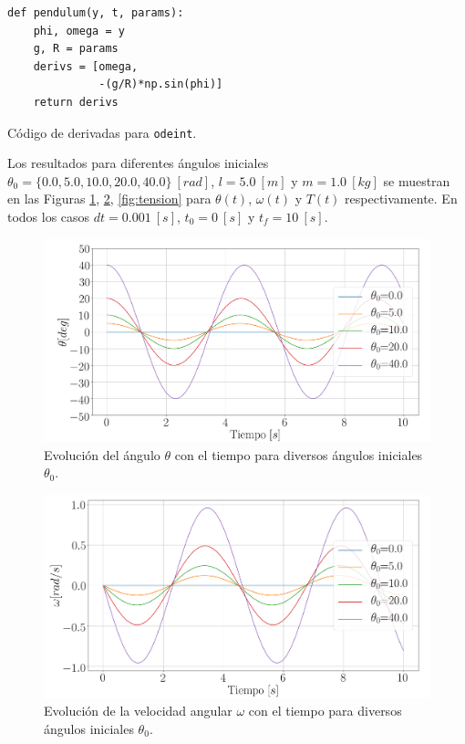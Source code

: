 \documentclass[journal]{IEEEtran}
\newenvironment{code}{\captionsetup{type=listing}}{\par\addvspace{\baselineskip}}
\begin{document}
\begin{code}
  \begin{verbatim}
def pendulum(y, t, params):
    phi, omega = y
    g, R = params
    derivs = [omega,
              -(g/R)*np.sin(phi)]
    return derivs
  \end{verbatim}
  \caption{Código de derivadas para \texttt{odeint}.}
  \label{code:derivs}
\end{code}

Los resultados para diferentes ángulos iniciales $\theta_0 = \{0.0, 5.0, 10.0, 20.0, 40.0\}~[rad]$, $l=5.0~[m]$ y $m=1.0~[kg]$ se muestran en las Figuras \ref{fig:theta}, \ref{fig:omega}, \ref{fig:tension} para $\theta(t)$, $\omega(t)$ y $T(t)$ respectivamente. En todos los casos $dt=0.001~[s]$, $t_0 = 0~[s]$ y $t_f = 10~[s]$.

\begin{figure}[!htb]
  \centering
  \includegraphics[width=\linewidth]{theta}
  \caption{Evolución del ángulo $\theta$ con el tiempo para diversos ángulos iniciales $\theta_0$.}
  \label{fig:theta}
\end{figure}

\begin{figure}[!htb]
  \centering
  \includegraphics[width=\linewidth]{omega}
  \caption{Evolución de la velocidad angular $\omega$ con el tiempo para diversos ángulos iniciales $\theta_0$.}
  \label{fig:omega}
\end{figure}
\end{document}
